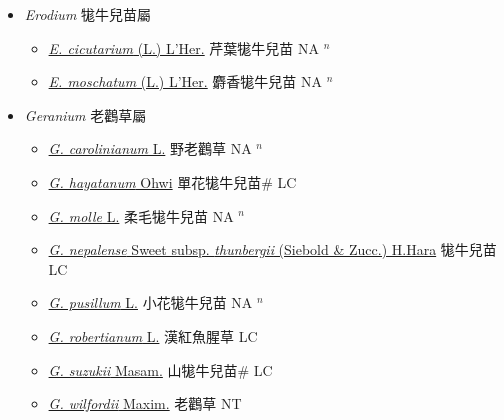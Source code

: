 
  \begin{itemize}
 \item[] \textit{Erodium} 牻牛兒苗屬
                    
  \begin{itemize}
        \item[] \href{http://www.theplantlist.org/tpl1.1/search?q=Erodium+cicutarium}{\textit{E. cicutarium} (L.) L'Her.}   芹葉牻牛兒苗 NA $^n$
        \item[] \href{http://www.theplantlist.org/tpl1.1/search?q=Erodium+moschatum}{\textit{E. moschatum} (L.) L'Her.}   麝香牻牛兒苗 NA $^n$
  \end{itemize}
 \item[] \textit{Geranium} 老鸛草屬
                    
  \begin{itemize}
        \item[] \href{http://www.theplantlist.org/tpl1.1/search?q=Geranium+carolinianum}{\textit{G. carolinianum} L.}   野老鸛草 NA $^n$
        \item[] \href{http://www.theplantlist.org/tpl1.1/search?q=Geranium+hayatanum}{\textit{G. hayatanum} Ohwi}   單花牻牛兒苗\# LC
        \item[] \href{http://www.theplantlist.org/tpl1.1/search?q=Geranium+molle}{\textit{G. molle} L.}   柔毛牻牛兒苗 NA $^n$
        \item[] \href{http://www.theplantlist.org/tpl1.1/search?q=Geranium+nepalense+subsp.+thunbergii}{\textit{G. nepalense} Sweet subsp. \textit{thunbergii} (Siebold \& Zucc.) H.Hara}   牻牛兒苗 LC
        \item[] \href{http://www.theplantlist.org/tpl1.1/search?q=Geranium+pusillum}{\textit{G. pusillum} L.}   小花牻牛兒苗 NA $^n$
        \item[] \href{http://www.theplantlist.org/tpl1.1/search?q=Geranium+robertianum}{\textit{G. robertianum} L.}   漢紅魚腥草 LC
        \item[] \href{http://www.theplantlist.org/tpl1.1/search?q=Geranium+suzukii}{\textit{G. suzukii} Masam.}   山牻牛兒苗\# LC
        \item[] \href{http://www.theplantlist.org/tpl1.1/search?q=Geranium+wilfordii}{\textit{G. wilfordii} Maxim.}   老鸛草 NT
  \end{itemize}
  \end{itemize}
